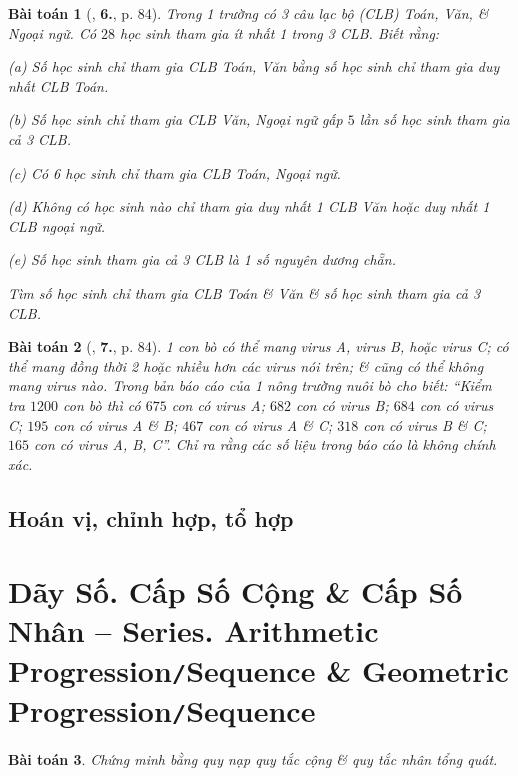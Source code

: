 \documentclass{article}
\numberwithin{equation}{section}
\newtheorem{baitoan}{Bài toán}[section]
\begin{document}
\begin{baitoan}[\cite{TL_chuyen_Toan_Dai_So_Giai_Tich_11}, \textbf{6.}, p. 84]
	Trong 1 trường có 3 câu lạc bộ (CLB) Toán, Văn, \& Ngoại ngữ. Có $28$ học sinh tham gia ít nhất 1 trong 3 CLB. Biết rằng:
	\begin{enumerate*}
		\item[(a)] Số học sinh chỉ tham gia CLB Toán, Văn bằng số học sinh chỉ tham gia duy nhất CLB Toán.
		\item[(b)] Số học sinh chỉ tham gia CLB Văn, Ngoại ngữ gấp $5$ lần số học sinh tham gia cả 3 CLB.
		\item[(c)] Có 6 học sinh chỉ tham gia CLB Toán, Ngoại ngữ.
		\item[(d)] Không có học sinh nào chỉ tham gia duy nhất 1 CLB Văn hoặc duy nhất 1 CLB ngoại ngữ.
		\item[(e)] Số học sinh tham gia cả 3 CLB là 1 số nguyên dương chẵn.
	\end{enumerate*}
	Tìm số học sinh chỉ tham gia CLB Toán \& Văn \& số học sinh tham gia cả 3 CLB.
\end{baitoan}

\begin{baitoan}[\cite{TL_chuyen_Toan_Dai_So_Giai_Tich_11}, \textbf{7.}, p. 84]
	1 con bò có thể mang virus A, virus B, hoặc virus C; có thể mang đồng thời 2 hoặc nhiều hơn các virus nói trên; \& cũng có thể không mang virus nào. Trong bản báo cáo của 1 nông trường nuôi bò cho biết: ``Kiểm tra $1200$ con bò thì có $675$ con có virus A; $682$ con có virus B; $684$ con có virus C; $195$ con có virus A \& B; $467$ con có virus A \& C; $318$ con có virus B \& C; $165$ con có virus A, B, C''. Chỉ ra rằng các số liệu trong báo cáo là không chính xác.
\end{baitoan}

\subsection{Hoán vị, chỉnh hợp, tổ hợp}


\section{Dãy Số. Cấp Số Cộng \& Cấp Số Nhân -- Series. Arithmetic Progression\texttt{/}Sequence \& Geometric Progression\texttt{/}Sequence}

\begin{baitoan}
	Chứng minh bằng quy nạp quy tắc cộng \& quy tắc nhân tổng quát.
\end{baitoan}
\end{document}
